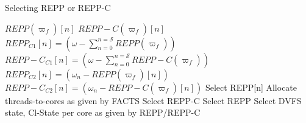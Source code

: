 \begin{algorithm}[h!]
    \caption{Selecting REPP or REPP-C}
    \label{pseudo:conditions}
  \begin{algorithmic}[1]
        \State $REPP(\varpi_{\mathit{f}})[n]$       
        \State $REPP-C(\varpi_{\mathit{f}})[n]$
        \vspace{1mm}
        \State $REPP_{C1}[n] = (\omega - \sum_{n=0}^{n=\mathcal S} REPP(\varpi_{\mathit{f}}))$
        \State $REPP-C_{C1}[n] = (\omega - \sum_{n=0}^{n=\mathcal S} REPP-C(\varpi_{\mathit{f}}))$
            \State $REPP_{C2}[n]   = (\omega_{n} - REPP(\varpi_{\mathit{f}})[n])$
            \State $REPP-C_{C2}[n]   = (\omega_{n} - REPP-C(\varpi_{\mathit{f}})[n])$
        \EndFor
            \State Select REPP[n]%
            \State Allocate threads-to-cores as given by FACTS
            \State Select REPP-C
            \Else
            \State Select REPP
            \EndIf
        \EndIf
        \State Select DVFS state, Cl-State per core as given by REPP/REPP-C
  \end{algorithmic}
\end{algorithm}

